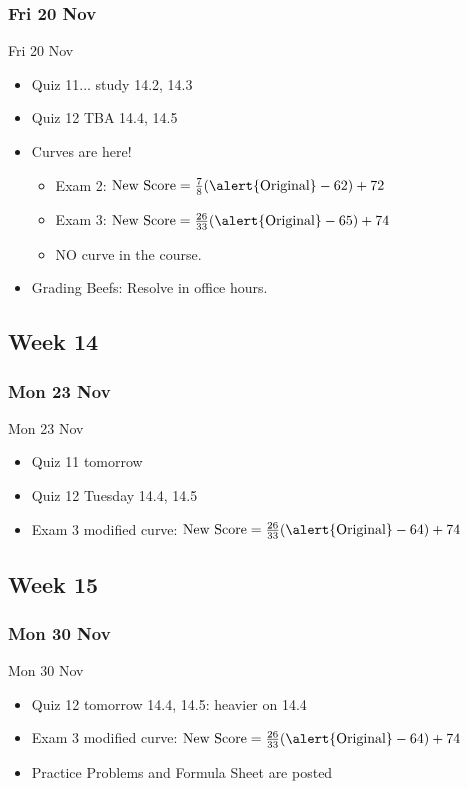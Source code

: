 \documentclass[12pt]{beamer}
\theoremstyle{plain}
\theoremstyle{definition}
\begin{document}
\subsubsection{Fri 20 Nov}
\begin{frame}{Fri 20 Nov}%
\begin{itemize}
\item Quiz 11... study 14.2, 14.3
\item Quiz 12 TBA 14.4, 14.5
\item Curves are here!
	\begin{itemize}
	\item Exam 2: $\text{New Score}= \textstyle\frac{7}{8}(\alert{\text{Original}}-62)+72$
	\item Exam 3: $\text{New Score}= \textstyle\frac{26}{33}(\alert{\text{Original}}-65)+74$
	\item NO curve in the course.
	\end{itemize}
\item Grading Beefs: Resolve in office hours.
\end{itemize}
\end{frame}

\subsection{Week 14}
\subsubsection{Mon 23 Nov}
\begin{frame}{Mon 23 Nov}%
\begin{itemize}
\item Quiz 11 tomorrow
\item Quiz 12 Tuesday 14.4, 14.5
\item Exam 3 modified curve: $\text{New Score}= \textstyle\frac{26}{33}(\alert{\text{Original}}-64)+74$
\end{itemize}
\end{frame}

\subsection{Week 15}
\subsubsection{Mon 30 Nov}
\begin{frame}{Mon 30 Nov}%
\begin{itemize}
\item Quiz 12 tomorrow 14.4, 14.5: heavier on 14.4
\item Exam 3 modified curve: $\text{New Score}= \textstyle\frac{26}{33}(\alert{\text{Original}}-64)+74$
\item Practice Problems and Formula Sheet are posted
\end{itemize}
\end{frame}
\end{document}
